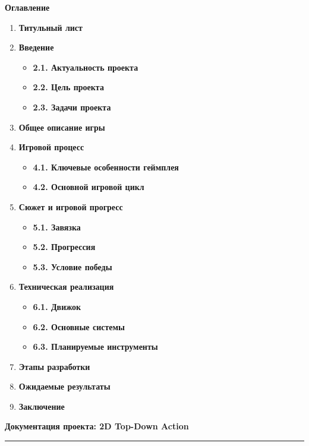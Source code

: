 \documentclass[
]{article}
\author{}
\date{}
\begin{document}
\textbf{Оглавление}

\begin{enumerate}
\def\labelenumi{\arabic{enumi}.}
\item
  \textbf{Титульный лист}
\item
  \textbf{Введение}

  \begin{itemize}
  \item
    \textbf{2.1. Актуальность проекта}
  \item
    \textbf{2.2. Цель проекта}
  \item
    \textbf{2.3. Задачи проекта}
  \end{itemize}
\item
  \textbf{Общее описание игры}
\item
  \textbf{Игровой процесс}

  \begin{itemize}
  \item
    \textbf{4.1. Ключевые особенности геймплея}
  \item
    \textbf{4.2. Основной игровой цикл}
  \end{itemize}
\item
  \textbf{Сюжет и игровой прогресс}

  \begin{itemize}
  \item
    \textbf{5.1. Завязка}
  \item
    \textbf{5.2. Прогрессия}
  \item
    \textbf{5.3. Условие победы}
  \end{itemize}
\item
  \textbf{Техническая реализация}

  \begin{itemize}
  \item
    \textbf{6.1. Движок}
  \item
    \textbf{6.2. Основные системы}
  \item
    \textbf{6.3. Планируемые инструменты}
  \end{itemize}
\item
  \textbf{Этапы разработки}
\item
  \textbf{Ожидаемые результаты}
\item
  \textbf{Заключение}
\end{enumerate}

\textbf{Документация проекта: 2D Top-Down Action}

\begin{center}\rule{0.5\linewidth}{0.5pt}\end{center}
\end{document}
